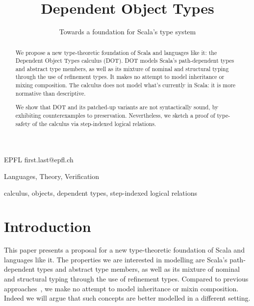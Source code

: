 \documentclass[9pt]{sigplanconf}
\begin{document}
\copyrightdata{[to be supplied]} 

\title{Dependent Object Types}
\subtitle{Towards a foundation for Scala's type system}

           {EPFL}
           {first.last@epfl.ch}

\maketitle

\begin{abstract}
We propose a new type-theoretic foundation of Scala and languages like
it: the Dependent Object Types calculus (DOT). DOT models Scala's
path-dependent types and abstract type members, as well as its mixture
of nominal and structural typing through the use of refinement
types. It makes no attempt to model inheritance or mixing
composition. The calculus does not model what's currently in Scala: it
is more normative than descriptive.

We show that DOT and its patched-up variants are not syntactically
sound, by exhibiting counterexamples to preservation. Nevertheless, we
sketch a proof of type-safety of the calculus via step-indexed logical
relations.
\end{abstract}


\terms
Languages, Theory, Verification

\keywords
calculus, objects, dependent types, step-indexed logical relations

\section{Introduction}

This paper presents a proposal for a new type-theoretic foundation of
Scala and languages like it. The properties we are interested in
modelling are Scala's path-dependent types and abstract type members,
as well as its mixture of nominal and structural typing through the
use of refinement types. Compared to previous approaches~\cite{nuObj,FS},
we make no attempt to model inheritance or mixin composition. Indeed
we will argue that such concepts are better modelled in a different
setting.
\end{document}
